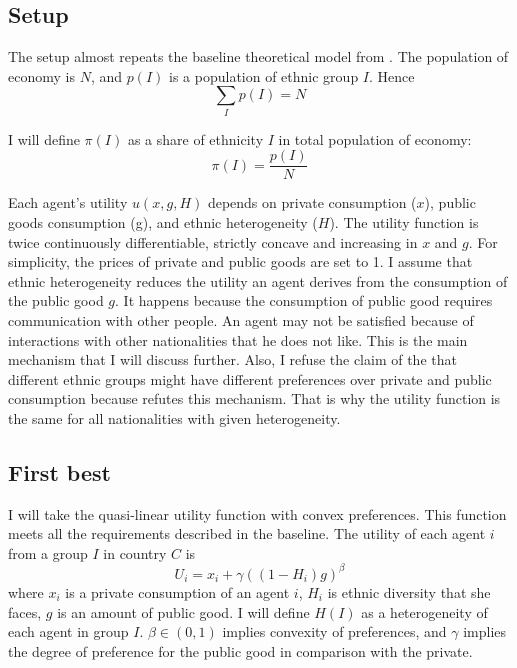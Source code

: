 \documentclass[letterpaper,11pt]{article}
\begin{document}
\subsection{Setup}

The setup almost repeats the baseline theoretical model from \cite{BreakUp}. The population of economy is $N$, and $p(I)$ is a population of ethnic group $I$. Hence
\[
    \sum_{I}p(I) = N
\]

I will define $\pi(I)$ as a share of ethnicity $I$  in total population of economy:
\[ \pi(I) = \frac{p(I)}{N} \]

Each agent's utility $u(x, g, H)$ depends on private consumption ($x$), public goods consumption (g), and ethnic heterogeneity ($H$). The utility function is twice continuously differentiable, strictly concave and increasing in $x$ and $g$. For simplicity, the prices of private and public goods are set to 1. I assume that ethnic heterogeneity reduces the utility an agent derives from the consumption of the public good $g$. It happens because the consumption of public good requires communication with other people. An agent may not be satisfied because of interactions with other nationalities that he does not like. This is the main mechanism that I will discuss further. Also, I refuse the claim of the \cite{AlesinaDivision} that different ethnic groups might have different preferences over private and public consumption because \cite{WhyUndermine} refutes this mechanism. That is why the utility function is the same for all nationalities with given heterogeneity. 

\subsection{First best}

I will take the quasi-linear utility function with convex preferences. This function meets all the requirements described in the baseline. The utility of each agent $i$ from a group $I$ in country $C$ is 
\begin{equation}
\label{eq:utility}
U_i = x_i + \gamma((1 - H_i) g)^\beta    
\end{equation}
where $x_i$ is a private consumption of an agent $i$, $H_i$ is ethnic diversity that she faces, $g$ is an amount of public good. I will define $H(I)$ as a heterogeneity of each agent in group $I$. $\beta \in (0,1) $ implies convexity of preferences, and $\gamma$ implies the degree of preference for the public good in comparison with the private.
\end{document}
